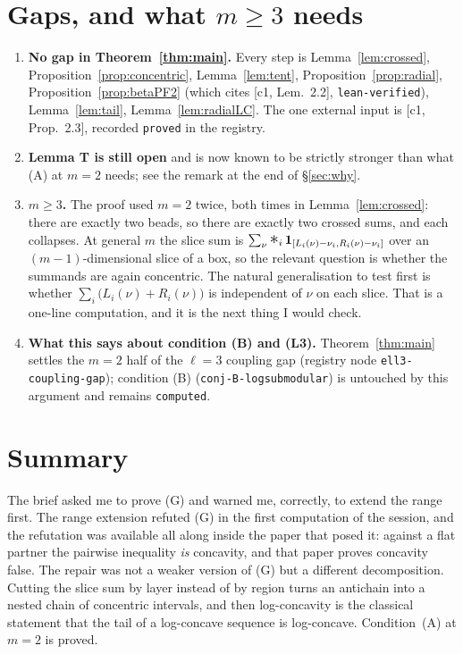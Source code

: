 \documentclass[11pt]{article}
\theoremstyle{definition}
\begin{document}
\section{Gaps, and what $m\ge3$ needs}

\begin{enumerate}
\item \textbf{No gap in Theorem~\ref{thm:main}.} Every step is Lemma~\ref{lem:crossed},
Proposition~\ref{prop:concentric}, Lemma~\ref{lem:tent},
Proposition~\ref{prop:radial}, Proposition~\ref{prop:betaPF2} (which cites
[c1, Lem.~2.2], \texttt{lean-verified}), Lemma~\ref{lem:tail}, Lemma~\ref{lem:radialLC}.
The one external input is [c1, Prop.~2.3], recorded \texttt{proved} in the registry.
\item \textbf{Lemma T is still open} and is now known to be strictly stronger than what (A)
at $m=2$ needs; see the remark at the end of §\ref{sec:why}.
\item \textbf{$m\ge3$.} The proof used $m=2$ twice, both times in
Lemma~\ref{lem:crossed}: there are exactly two beads, so there are exactly two crossed sums,
and each collapses. At general $m$ the slice sum is
$\sum_\nu\mathop{\text{\Large$*$}}_{i}\mathbf 1_{[L_i(\nu)-\nu_i,R_i(\nu)-\nu_i]}$ over an
$(m-1)$-dimensional slice of a box, so the relevant question is whether the summands are
again concentric. The natural generalisation to test first is whether
$\sum_i\bigl(L_i(\nu)+R_i(\nu)\bigr)$ is independent of $\nu$ on each slice. That is a
one-line computation, and it is the next thing I would check.
\item \textbf{What this says about condition (B) and (L3).} Theorem~\ref{thm:main} settles
the $m=2$ half of the $\ell=3$ coupling gap (registry node \texttt{ell3-coupling-gap});
condition (B) (\texttt{conj-B-logsubmodular}) is untouched by this argument and remains
\texttt{computed}.
\end{enumerate}

\section{Summary}

The brief asked me to prove (G) and warned me, correctly, to extend the range first. The
range extension refuted (G) in the first computation of the session, and the refutation was
available all along inside the paper that posed it: against a flat partner the pairwise
inequality \emph{is} concavity, and that paper proves concavity false. The repair was not a
weaker version of (G) but a different decomposition. Cutting the slice sum by layer instead
of by region turns an antichain into a nested chain of concentric intervals, and then
log-concavity is the classical statement that the tail of a log-concave sequence is
log-concave. Condition~(A) at $m=2$ is proved.
\end{document}
